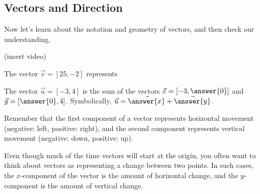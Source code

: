 \documentclass{ximera}
\begin{document}
\subsection*{Vectors and Direction}

    Now let's learn about the notation and geometry of vectors, and then check our understanding.

    (insert video)

\begin{problem}

The vector $\vec{v}=[25, -2]$ represents \begin{multipleChoice}
\end{multipleChoice}

The vector $\vec{u}=[-3,4]$ is the sum of the vectors $\vec{x}=[-3,\answer{0}]$ and $\vec{y}=[\answer{0},4]$. Symbolically, $\vec{u}=\vec{\answer{x}}+\vec{\answer{y}}$.

\begin{feedback}
Remember that the first component of a vector represents horizontal movement (negative: left, positive: right), and the second component represents vertical movement (negative: down, positive: up).
\end{feedback}

\end{problem}

Even though much of the time vectors will start at the origin, you often want to think about vectors as representing a change between two points. In such cases, the $x$-component of the vector is the amount of horizontal change, and the $y$-component is the amount of vertical change.
\end{document}
